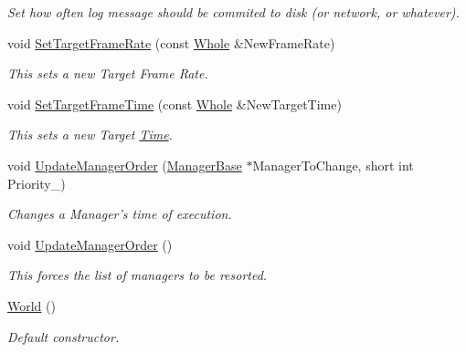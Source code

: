 \begin{DoxyCompactItemize}
\begin{DoxyCompactList}\small\item\em Set how often log message should be commited to disk (or network, or whatever). \item\end{DoxyCompactList}\item 
void \hyperlink{classMezzanine_1_1World_a799427ea004a3954d8d1c30b2537e691}{SetTargetFrameRate} (const \hyperlink{namespaceMezzanine_adcbb6ce6d1eb4379d109e51171e2e493}{Whole} \&NewFrameRate)
\begin{DoxyCompactList}\small\item\em This sets a new Target Frame Rate. \item\end{DoxyCompactList}\item 
void \hyperlink{classMezzanine_1_1World_afd7ea23e2108a1ddd0407e77110f35a0}{SetTargetFrameTime} (const \hyperlink{namespaceMezzanine_adcbb6ce6d1eb4379d109e51171e2e493}{Whole} \&NewTargetTime)
\begin{DoxyCompactList}\small\item\em This sets a new Target \hyperlink{structMezzanine_1_1Time}{Time}. \item\end{DoxyCompactList}\item 
void \hyperlink{classMezzanine_1_1World_a13b4ca08c4e7764232de0d1b3053a6a5}{UpdateManagerOrder} (\hyperlink{classMezzanine_1_1ManagerBase}{ManagerBase} $\ast$ManagerToChange, short int Priority\_\-)
\begin{DoxyCompactList}\small\item\em Changes a Manager's time of execution. \item\end{DoxyCompactList}\item 
void \hyperlink{classMezzanine_1_1World_ab134ca0bf6b75572409a3ebf20ac2e6b}{UpdateManagerOrder} ()
\begin{DoxyCompactList}\small\item\em This forces the list of managers to be resorted. \item\end{DoxyCompactList}\item 
\hyperlink{classMezzanine_1_1World_aa6bf8150f82691b821ae43e9d2b0b4fd}{World} ()
\begin{DoxyCompactList}\small\item\em Default constructor. \item\end{DoxyCompactList}\item 

\end{DoxyCompactItemize}
